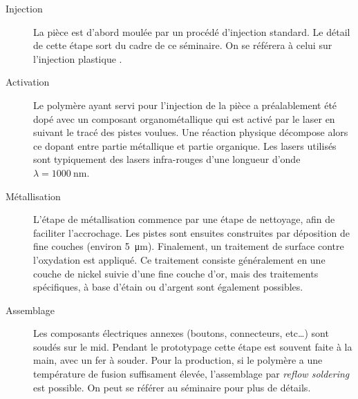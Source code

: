 \begin{description}
    \item[Injection] La pièce est d'abord moulée par un procédé d'injection standard.
        Le détail de cette étape sort du cadre de ce séminaire.
        On se référera à celui sur l'injection plastique \cite{injection-2013}.

    \item[Activation] Le polymère ayant servi pour l'injection de la pièce a préalablement été dopé avec un composant organométallique qui est activé par le laser en suivant le tracé des pistes voulues.
        Une réaction physique décompose alors ce dopant entre partie métallique et partie organique.
        Les lasers utilisés sont typiquement des lasers infra-rouges d'une longueur d'onde $\lambda = \SI{1000}{\nano\meter}$.
    \item[Métallisation] L'étape de métallisation commence par une étape de nettoyage, afin de faciliter l'accrochage.
        Les pistes sont ensuites construites par déposition de fine couches (environ \SI{5}{\micro\meter}).
        Finalement, un traitement de surface contre l'oxydation est appliqué.
        Ce traitement consiste généralement en une couche de nickel suivie d'une fine couche d'or, mais des traitements spécifiques, à base d'étain ou d'argent sont également possibles.
    \item[Assemblage] Les composants électriques annexes (boutons, connecteurs, etc\ldots) sont soudés sur le \gls{mid}.
        Pendant le prototypage cette étape est souvent faite à la main, avec un fer à souder.
        Pour la production, si le polymère a une température de fusion suffisament élevée, l'assemblage par \emph{reflow soldering} est possible.
        On peut se référer au séminaire \cite{smd-assembly-2013} pour plus de détails.

\end{description}



